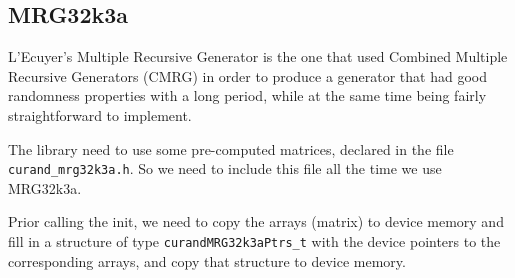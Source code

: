 \subsection{MRG32k3a}
\label{sec:MRG32k3a}

L'Ecuyer's Multiple Recursive Generator
is the one that used Combined Multiple Recursive Generators (CMRG) in order to
produce a generator that had good randomness properties with a long
period, while at the same time being fairly straightforward to implement.

 

The library need to use some pre-computed matrices, declared in the file
\verb!curand_mrg32k3a.h!. So we need to include this file all the time we use
MRG32k3a. 

Prior calling the init, we need to copy the arrays (matrix) to device memory and
fill in a structure of type \verb!curandMRG32k3aPtrs_t! with the device pointers to the
corresponding arrays, and copy that structure to device memory.

